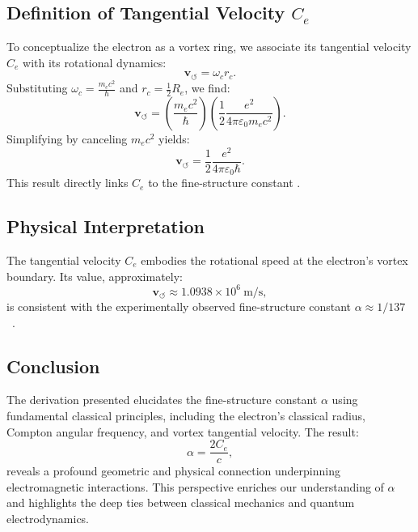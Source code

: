 \documentclass[preprint]{revtex4-2}
\begin{document}
    \subsection*{Definition of Tangential Velocity $C_e$}
    To conceptualize the electron as a vortex ring, we associate its tangential velocity $C_e$ with its rotational dynamics:
    \begin{equation*}
        \mathbf{v}_{\scriptscriptstyle\boldsymbol{\circlearrowleft}} = \omega_c r_c.
    \end{equation*}
    Substituting $\omega_c = \frac{m_e c^2}{\hbar}$ and $r_c = \frac{1}{2} R_e$, we find:
    \begin{equation*}
        \mathbf{v}_{\scriptscriptstyle\boldsymbol{\circlearrowleft}} = \left( \frac{m_e c^2}{\hbar} \right) \left( \frac{1}{2} \frac{e^2}{4\pi \varepsilon_0 m_e c^2} \right).
    \end{equation*}
    Simplifying by canceling $m_e c^2$ yields:
    \begin{equation*}
        \mathbf{v}_{\scriptscriptstyle\boldsymbol{\circlearrowleft}} = \frac{1}{2} \frac{e^2}{4\pi \varepsilon_0 \hbar}.\label{eq:C_e-from-compton}
    \end{equation*}
    This result directly links $C_e$ to the fine-structure constant \cite{vinen2024}.

    \subsection*{Physical Interpretation}
    The tangential velocity $C_e$ embodies the rotational speed at the electron's vortex boundary. Its value, approximately:
    \begin{equation*}
        \mathbf{v}_{\scriptscriptstyle\boldsymbol{\circlearrowleft}} \approx 1.0938 \times 10^6 \ \text{m/s},
    \end{equation*}
    is consistent with the experimentally observed fine-structure constant $\alpha \approx 1/137$~\cite{ricca1998}.

    \subsection*{Conclusion}
    The derivation presented elucidates the fine-structure constant $\alpha$ using fundamental classical principles, including the electron's classical radius, Compton angular frequency, and vortex tangential velocity. The result:
    \begin{equation*}
        \alpha = \frac{2 C_e}{c},
    \end{equation*}
    reveals a profound geometric and physical connection underpinning electromagnetic interactions.
    This perspective enriches our understanding of $\alpha$ and highlights the deep ties between classical mechanics and quantum electrodynamics.
\end{document}
